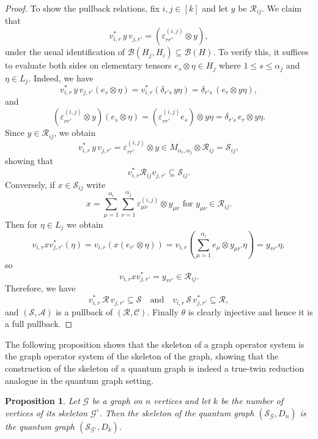 \documentclass[11pt]{amsart}
\numberwithin{equation}{section}
\theoremstyle{plain}
\newtheorem{proposition}[theorem]{Proposition}
\theoremstyle{definition}
\theoremstyle{remark}
\newcommand{\A}{{\mathcal{A}}}
\newcommand{\B}{{\mathcal{B}}}
\newcommand{\C}{{\mathcal{C}}}
\newcommand{\G}{{\mathcal{G}}}
\newcommand{\R}{{\mathcal{R}}}
\renewcommand{\S}{{\mathcal{S}}}
\newcommand{\eps}{\varepsilon}
\newcommand{\qand}{\quad\text{and}\quad}
\begin{document}
\begin{proof}
To show the pullback relations, fix $i,j \in [k]$ and  let $y$ be $\R_{ij}$. We claim that
\[
v_{i,r}^*\,y\,v_{j,r'}=(\eps^{(i,j)}_{rr'}\otimes y),
\]
under the usual identification of $\B(H_j,H_i) \subseteq \B(H)$.
To verify this, it suffices to evaluate both sides on elementary tensors $e_s\otimes\eta\in H_j$
where $1\le s\le \alpha_j$ and $\eta\in L_j$. Indeed, we have
\[
v_{i,r}^*\,y\,v_{j,r'}(e_s\otimes\eta)
=
v_{i,r}^*(\delta_{r's}\,y\eta)
=
\delta_{r's}\,(e_r\otimes y\eta),
\]
and
\[
(\eps^{(i,j)}_{rr'}\otimes y)(e_s\otimes\eta)
=
(\eps^{(i,j)}_{rr'}e_s)\otimes y\eta
=
\delta_{r's}\,e_r\otimes y\eta.
\]
Since $y\in\R_{ij}$, we obtain
\[
v_{i,r}^*\,y\,v_{j,r'}=\eps^{(i,j)}_{rr'}\otimes y\in
M_{\alpha_i,\alpha_j}\otimes \R_{ij}=\S_{ij},
\]
showing that 
\[
v_{i,r}^*\R_{ij} v_{j,r'} \subseteq \S_{ij}.
\]
Conversely, if $x\in\S_{ij}$ write
\[
x=\sum_{\mu=1}^{\alpha_i}\sum_{\nu=1}^{\alpha_j} \eps^{(i,j)}_{\mu \nu}\otimes y_{\mu \nu}
\text{ for } y_{\mu\nu}\in\R_{ij}.
\]
Then for $\eta\in L_j$ we obtain
\[
v_{i,r}x v_{j,r'}^*(\eta)
=
v_{i,r}(x(e_{r'}\otimes\eta))
=
v_{i,r}(\sum_{\mu=1}^{\alpha_i} e_\mu\otimes y_{\mu r'}\eta)
=
y_{rr'}\eta,
\]
so
\[
v_{i,r} x v_{j,r'}^*=y_{rr'}\in\R_{ij}.
\]
Therefore, we have
\[
v_{i,r}^*\,\R\,v_{j,r'}\subseteq \S 
\qand
v_{i,r}\,\S\,v_{j,r'}^*\subseteq \R,
\]
and $(\S,\A)$ is a  pullback of $(\R,\C)$.
Finally $\theta$ is clearly injective and hence it is a full pullback.
\end{proof}

The following proposition shows that the skeleton of a graph operator system is the graph operator system of the skeleton of the graph, showing that the construction of the skeleton of a quantum graph is indeed a true-twin reduction analogue in the quantum graph setting.

\begin{proposition}\label{P:qskgraphs}
Let $\G$ be a graph on $n$ vertices and let $k$ be the number of vertices of its skeleton $\G^\circ$. Then the skeleton of the quantum graph $(\S_\G, D_n)$ is the quantum graph $(\S_{\G^\circ}, D_k)$.
\end{proposition}
\end{document}
